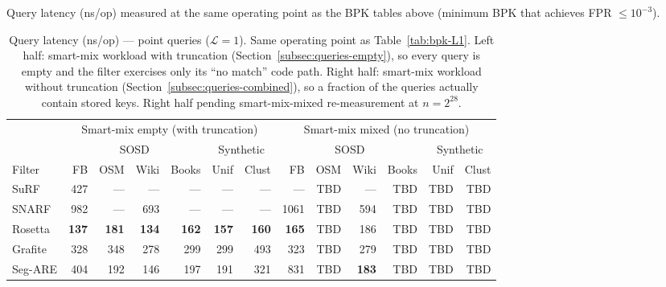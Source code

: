 Query latency (ns/op) measured at the same operating point as the BPK tables above
(minimum BPK that achieves FPR $\leq 10^{-3}$).

\begin{table}[H]
    \centering
    \footnotesize
    \setlength{\tabcolsep}{4pt}
    \begin{tabular}{@{}lrrrrrr|rrrrrr@{}}
        \toprule
        & \multicolumn{6}{c|}{Smart-mix empty (with truncation)} & \multicolumn{6}{c}{Smart-mix mixed (no truncation)} \\
        \cmidrule(lr){2-7} \cmidrule(lr){8-13}
        & \multicolumn{4}{c}{SOSD} & \multicolumn{2}{c|}{Synthetic} & \multicolumn{4}{c}{SOSD} & \multicolumn{2}{c}{Synthetic} \\
        \cmidrule(lr){2-5} \cmidrule(lr){6-7} \cmidrule(lr){8-11} \cmidrule(lr){12-13}
        Filter & FB & OSM & Wiki & Books & Unif & Clust & FB & OSM & Wiki & Books & Unif & Clust \\
        \midrule
        SuRF    & 427           & \textnormal{---} & \textnormal{---} & \textnormal{---} & \textnormal{---} & \textnormal{---} & \textnormal{---} & TBD & \textnormal{---} & TBD & TBD & TBD \\
        SNARF   & 982           & \textnormal{---} & 693           & \textnormal{---} & \textnormal{---} & \textnormal{---} & 1061          & TBD & 594              & TBD & TBD & TBD \\
        Rosetta & \textbf{137}  & \textbf{181}  & \textbf{134}  & \textbf{162}  & \textbf{157}  & \textbf{160}  & \textbf{165}     & TBD & 186              & TBD & TBD & TBD \\
        Grafite & 328           & 348           & 278           & 299           & 299           & 493           & 323              & TBD & 279              & TBD & TBD & TBD \\
        Seg-ARE & 404           & 192           & 146           & 197           & 191           & 321           & 831              & TBD & \textbf{183}     & TBD & TBD & TBD \\
        \bottomrule
    \end{tabular}
    \caption{Query latency (ns/op) --- point queries ($\mathcal{L}=1$).
             Same operating point as Table~\ref{tab:bpk-L1}.
             Left half: smart-mix workload with truncation
             (Section~\ref{subsec:queries-empty}), so every query is
             empty and the filter exercises only its ``no match''
             code path. Right half: smart-mix workload without
             truncation (Section~\ref{subsec:queries-combined}), so a
             fraction of the queries actually contain stored keys.
             Right half pending smart-mix-mixed re-measurement at
             $n = 2^{28}$.}
    \label{tab:latency-L1}
\end{table}

